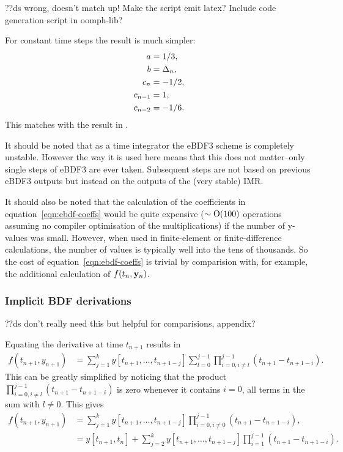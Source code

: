 ??ds wrong, doesn't match up! Make the script emit latex?
Include code generation script in oomph-lib?

For constant time steps the result is much simpler:
\begin{equation}
  \begin{aligned}
    a &= 1/3, \\
    b &= \Delta_{n},\\ 
    c_n &= -1/2,\\
    c_{n-1} & = 1,\\
    c_{n-2} &= -1/6.
  \end{aligned}
\end{equation} 
This matches with the result in \cite[pg. 364]{HairerNorsettWanner}.

It should be noted that as a time integrator the eBDF3 scheme is completely unstable.
However the way it is used here means that this does not matter--only single steps of eBDF3 are ever taken.
Subsequent steps are not based on previous eBDF3 outputs but instead on the outputs of the (very stable) IMR.

It should also be noted that the calculation of the coefficients in equation~\eqref{eqn:ebdf-coeffs} would be quite expensive ($\sim \text{O}(100)$ operations assuming no compiler optimisation of the multiplications) if the number of y-values was small.
However, when used in finite-element or finite-difference calculations, the number of values is typically well into the tens of thousands.
So the cost of equation~\eqref{eqn:ebdf-coeffs} is trivial by comparision with, for example, the additional calculation of $f(t_n, \mathbf{y}_n)$.


\subsubsection{Implicit BDF derivations}
??ds don't really need this but helpful for comparisions, appendix?

Equating the derivative at time $t_{n+1}$ results in
\begin{equation}
  \begin{aligned}
    f(t_{n+1}, y_{n+1}) &= \sum_{j=1}^k y[t_{n+1}, \ldots, t_{n+1-j}] \sum_{l=0}^{j-1} \prod_{i=0, i \neq l}^{j-1} (t_{n+1} - t_{n+1-i}).
  \end{aligned}
\end{equation} 
This can be greatly simplified by noticing that the product $ \prod_{i=0, i \neq l}^{j-1} (t_{n+1} - t_{n+1-i})$ is zero whenever it contains $i=0$, \ie all terms in the sum with $l \neq 0$.
This gives
\begin{equation}
  \begin{aligned}
    f(t_{n+1}, y_{n+1}) &= \sum_{j=1}^k y[t_{n+1}, \ldots, t_{n+1-j}] \prod_{i=0, i \neq 0}^{j-1} (t_{n+1} - t_{n+1-i}), \\
    &=  y[t_{n+1}, t_n] + \sum_{j=2}^k y[t_{n+1}, \ldots, t_{n+1-j}] \prod_{i=1}^{j-1} (t_{n+1} - t_{n+1-i}). \\
  \end{aligned}
\end{equation}

